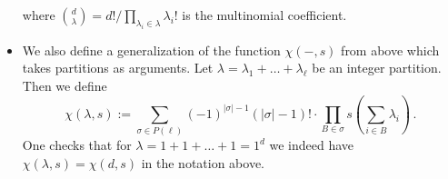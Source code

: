 \documentclass[authorcolumns,numberwithinsect]{no-lipics-v2022}
\begin{document}
\begin{itemize}
\begin{equation}
    \end{equation}
    where $\binom{d}{\lambda} = d! / \prod_{\lambda_i \in \lambda} \lambda_i!$ is the multinomial coefficient.
    \item We also define a generalization of the function $\chi(-, s)$ from above which takes partitions as arguments. Let $\lambda = \lambda_1 + \ldots + \lambda_\ell$ be an integer partition. Then we define
    \begin{equation} \label{eqn:chi_generalization}
        \chi(\lambda , s) := \sum_{\sigma\in P(\ell)} (-1)^{|\sigma|-1} (|\sigma|-1)! \cdot \prod_{B \in \sigma} s\left(\sum_{i \in B} \lambda_i \right)\,.
    \end{equation}
    One checks that for $\lambda = 1 + 1 + \ldots + 1 = 1^d$ we indeed have $\chi(\lambda, s)=\chi(d,s)$ in the notation above.
\end{itemize}
\end{document}
